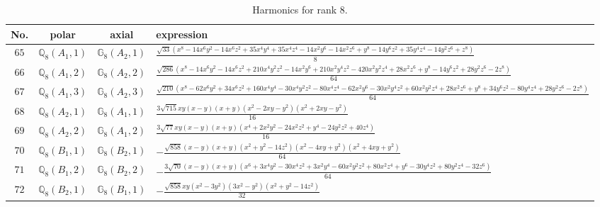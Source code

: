 \documentclass[fleqn,8pt,landscape]{jsarticle}
\begin{document}
\begin{table}[ht!]
\begin{center}
\caption{Harmonics for rank 8.}
\renewcommand{\arraystretch}{1.3}
\begin{tabular}{cccl} \hline \hline
No. & polar & axial & expression \\ \hline
$ 65 $ & $ \mathbb{Q}_{8}(A_{1},1) $ & $ \mathbb{G}_{8}(A_{2},1) $ & $ \frac{\sqrt{33} \left(x^{8} - 14 x^{6} y^{2} - 14 x^{6} z^{2} + 35 x^{4} y^{4} + 35 x^{4} z^{4} - 14 x^{2} y^{6} - 14 x^{2} z^{6} + y^{8} - 14 y^{6} z^{2} + 35 y^{4} z^{4} - 14 y^{2} z^{6} + z^{8}\right)}{8} $ \\
$ 66 $ & $ \mathbb{Q}_{8}(A_{1},2) $ & $ \mathbb{G}_{8}(A_{2},2) $ & $ \frac{\sqrt{286} \left(x^{8} - 14 x^{6} y^{2} - 14 x^{6} z^{2} + 210 x^{4} y^{2} z^{2} - 14 x^{2} y^{6} + 210 x^{2} y^{4} z^{2} - 420 x^{2} y^{2} z^{4} + 28 x^{2} z^{6} + y^{8} - 14 y^{6} z^{2} + 28 y^{2} z^{6} - 2 z^{8}\right)}{64} $ \\
$ 67 $ & $ \mathbb{Q}_{8}(A_{1},3) $ & $ \mathbb{G}_{8}(A_{2},3) $ & $ \frac{\sqrt{210} \left(x^{8} - 62 x^{6} y^{2} + 34 x^{6} z^{2} + 160 x^{4} y^{4} - 30 x^{4} y^{2} z^{2} - 80 x^{4} z^{4} - 62 x^{2} y^{6} - 30 x^{2} y^{4} z^{2} + 60 x^{2} y^{2} z^{4} + 28 x^{2} z^{6} + y^{8} + 34 y^{6} z^{2} - 80 y^{4} z^{4} + 28 y^{2} z^{6} - 2 z^{8}\right)}{64} $ \\
$ 68 $ & $ \mathbb{Q}_{8}(A_{2},1) $ & $ \mathbb{G}_{8}(A_{1},1) $ & $ \frac{3 \sqrt{715} x y \left(x - y\right) \left(x + y\right) \left(x^{2} - 2 x y - y^{2}\right) \left(x^{2} + 2 x y - y^{2}\right)}{16} $ \\
$ 69 $ & $ \mathbb{Q}_{8}(A_{2},2) $ & $ \mathbb{G}_{8}(A_{1},2) $ & $ \frac{3 \sqrt{77} x y \left(x - y\right) \left(x + y\right) \left(x^{4} + 2 x^{2} y^{2} - 24 x^{2} z^{2} + y^{4} - 24 y^{2} z^{2} + 40 z^{4}\right)}{16} $ \\
$ 70 $ & $ \mathbb{Q}_{8}(B_{1},1) $ & $ \mathbb{G}_{8}(B_{2},1) $ & $ - \frac{\sqrt{858} \left(x - y\right) \left(x + y\right) \left(x^{2} + y^{2} - 14 z^{2}\right) \left(x^{2} - 4 x y + y^{2}\right) \left(x^{2} + 4 x y + y^{2}\right)}{64} $ \\
$ 71 $ & $ \mathbb{Q}_{8}(B_{1},2) $ & $ \mathbb{G}_{8}(B_{2},2) $ & $ - \frac{3 \sqrt{70} \left(x - y\right) \left(x + y\right) \left(x^{6} + 3 x^{4} y^{2} - 30 x^{4} z^{2} + 3 x^{2} y^{4} - 60 x^{2} y^{2} z^{2} + 80 x^{2} z^{4} + y^{6} - 30 y^{4} z^{2} + 80 y^{2} z^{4} - 32 z^{6}\right)}{64} $ \\
$ 72 $ & $ \mathbb{Q}_{8}(B_{2},1) $ & $ \mathbb{G}_{8}(B_{1},1) $ & $ - \frac{\sqrt{858} x y \left(x^{2} - 3 y^{2}\right) \left(3 x^{2} - y^{2}\right) \left(x^{2} + y^{2} - 14 z^{2}\right)}{32} $ \\

\end{tabular}
\end{center}
\end{table}
\end{document}
